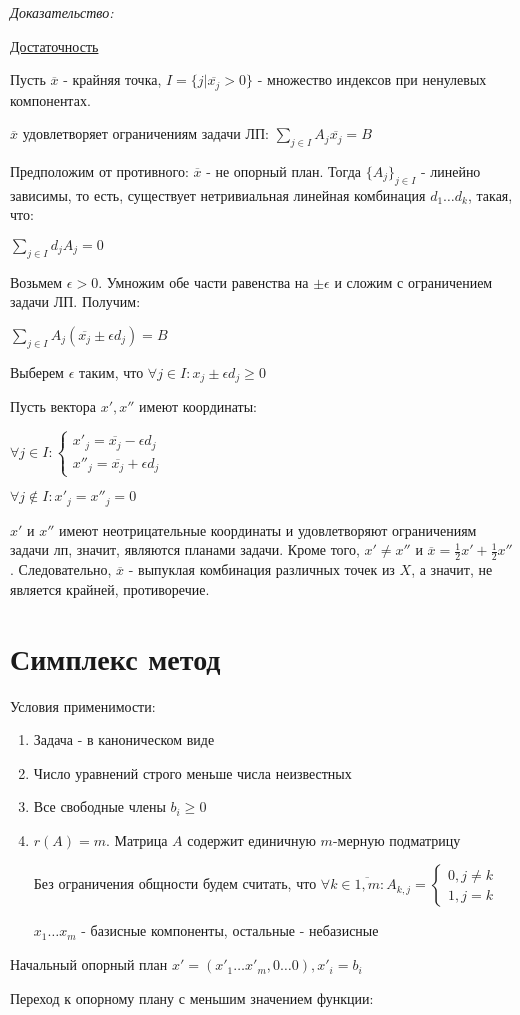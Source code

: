 \documentclass[11pt]{article}
\newenvironment{proof}{
  \textit{Доказательство:}
    
  \begin{adjustwidth}{1em}{}
}{
  \end{adjustwidth}
}
\begin{document}
\begin{sloppypar}
\begin{proof}
\underline{Достаточность}

Пусть $\overline{x}$ - крайняя точка, $I = \{j | \overline{x_j} > 0\}$ - множество индексов при ненулевых компонентах.

$\overline{x}$ удовлетворяет ограничениям задачи ЛП: $\sum_{j \in I} A_j \overline{x_j} = B$

Предположим от противного: $\overline{x}$ - не опорный план. Тогда $\{A_j\}_{j \in I}$ - линейно зависимы, то есть, существует нетривиальная линейная комбинация $d_1 \dots d_k$, такая, что:

$\sum_{j \in I} d_j A_j = 0$

Возьмем $\epsilon > 0$. Умножим обе части равенства на $\pm \epsilon$ и сложим с ограничением задачи ЛП. Получим:

$\sum_{j \in I} A_j (\overline{x_j} \pm \epsilon d_j) = B$

Выберем $\epsilon$ таким, что $\forall j \in I: x_j \pm \epsilon d_j \geq 0$

Пусть вектора $x', x''$ имеют координаты:

$\forall j \in I: \begin{cases}
  x'_j = \overline{x_j} - \epsilon d_j \\
  x''_j = \overline{x_j} + \epsilon d_j
\end{cases}$

$\forall j \notin I: x'_j = x''_j = 0$

$x'$ и $x''$ имеют неотрицательные координаты и удовлетворяют ограничениям задачи лп, значит, являются планами задачи. Кроме того, $x' \neq x''$ и $\overline{x} = \frac{1}{2}x' + \frac{1}{2}x''$. Следовательно, $\overline{x}$ - выпуклая комбинация различных точек из $X$, а значит, не является крайней, противоречие.
\end{proof}

\section*{Симплекс метод}
Условия применимости:
\begin{enumerate}
  \item Задача - в каноническом виде
  \item Число уравнений строго меньше числа неизвестных
  \item Все свободные члены $b_i \geq 0$
  \item $r(A) = m$. Матрица $A$ содержит единичную $m$-мерную подматрицу
  
  Без ограничения общности будем считать, что
  $\forall k \in \overline{1, m}: A_{k, j} = 
  \begin{cases}
    0, j \neq k \\
    1, j = k
  \end{cases}$
  
  $x_1 \dots x_m$ - базисные компоненты, остальные - небазисные
\end{enumerate}

Начальный опорный план $x' = (x'_1 \dots x'_m, 0 \dots 0), x'_i = b_i$

Переход к опорному плану с меньшим значением функции:

\end{sloppypar}
\end{document}
